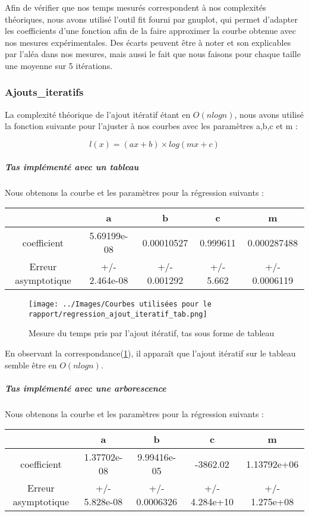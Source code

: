 \documentclass[12pt,a4paper]{article}
\begin{document}
Afin de vérifier que nos temps mesurés correspondent à nos complexités théoriques, nous avons utilisé l'outil fit fourni par gnuplot, qui permet d'adapter les coefficients d'une fonction afin de la faire approximer la courbe obtenue avec nos mesures expérimentales. Des écarts peuvent être à noter et son explicables par l'aléa dans nos mesures, mais aussi le fait que nous faisons pour chaque taille une moyenne sur 5 itérations.

\subsubsection{Ajouts\_iteratifs}

La complexité théorique de l'ajout itératif étant en $O(n log n)$, nous avons utilisé la fonction suivante pour l'ajuster à nos courbes avec les paramètres a,b,c et m : 

$$
l(x) = (a x +b) \times log (mx +c)
$$

\subparagraph{Tas implémenté avec un tableau}

Nous obtenons la courbe et les paramètres pour la régression suivants : 

\begin{center}
\begin{tabular}{|c|c|c|c|c|}
\hline
 & a & b & c & m\\
\hline
coefficient & 5.69199e-08 & 0.00010527 & 0.999611 & 0.000287488 \\
Erreur asymptotique & +/- 2.464e-08 & +/- 0.001292 & +/- 5.662  & +/- 0.0006119\\
\hline
\end{tabular}
\end{center}


\begin{figure}[hbtp]
\centering
\texttt{[image: ../Images/Courbes utilisées pour le rapport/regression\_ajout\_iteratif\_tab.png]}
\caption{Mesure du temps pris par l'ajout itératif, tas sous forme de tableau}
\label{fig1}
\end{figure}

En observant la correspondance(\ref{fig1}), il apparaît que l'ajout itératif sur le tableau semble être en $O(n log n)$.


\subparagraph{Tas implémenté avec une arborescence}

Nous obtenons la courbe et les paramètres pour la régression suivants : 


\begin{center}
\begin{tabular}{|c|c|c|c|c|}
\hline
 & a & b & c & m\\
\hline
coefficient & 1.37702e-08 & 
9.99416e-05 & 
-3862.02 & 
1.13792e+06 \\
Erreur asymptotique & +/- 5.828e-08 & +/- 0.0006326 & +/- 4.284e+10   & +/- 1.275e+08\\
\hline
\end{tabular}
\end{center}
\end{document}
